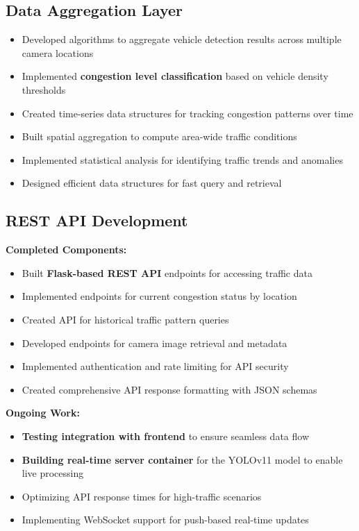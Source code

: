 \subsection{Data Aggregation Layer}

\begin{itemize}
    \item Developed algorithms to aggregate vehicle detection results across multiple camera locations
    \item Implemented \textbf{congestion level classification} based on vehicle density thresholds
    \item Created time-series data structures for tracking congestion patterns over time
    \item Built spatial aggregation to compute area-wide traffic conditions
    \item Implemented statistical analysis for identifying traffic trends and anomalies
    \item Designed efficient data structures for fast query and retrieval
\end{itemize}

\subsection{REST API Development}

\textbf{Completed Components:}
\begin{itemize}
    \item Built \textbf{Flask-based REST API} endpoints for accessing traffic data
    \item Implemented endpoints for current congestion status by location
    \item Created API for historical traffic pattern queries
    \item Developed endpoints for camera image retrieval and metadata
    \item Implemented authentication and rate limiting for API security
    \item Created comprehensive API response formatting with JSON schemas
\end{itemize}

\textbf{Ongoing Work:}
\begin{itemize}
    \item \textbf{Testing integration with frontend} to ensure seamless data flow
    \item \textbf{Building real-time server container} for the YOLOv11 model to enable live processing
    \item Optimizing API response times for high-traffic scenarios
    \item Implementing WebSocket support for push-based real-time updates
\end{itemize}

